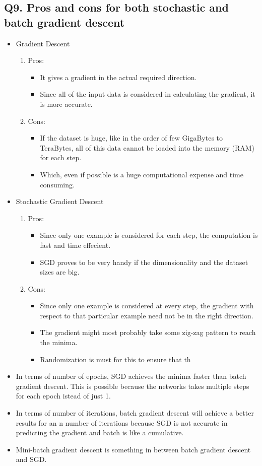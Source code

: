 \documentclass[a4paper,11pt]{article}
\begin{document}
\subsection*{Q9. Pros and cons for both stochastic and batch gradient descent}
\begin{itemize}
	\item Gradient Descent
		\begin{enumerate}
			\item Pros:
			 	\begin{itemize}
			 		\item It gives a gradient in the actual required direction.
			 		\item Since all of the input data is considered in calculating the gradient, it is more accurate.
			 	\end{itemize}
		 	\item Cons:
		 	\begin{itemize}
		 		\item If the dataset is huge, like in the order of few GigaBytes to TeraBytes, all of this data cannot be loaded into the memory (RAM) for each step.
		 		\item Which, even if possible is a huge computational expense and time consuming.
		 	\end{itemize}
		\end{enumerate}
	\item Stochastic Gradient Descent
	\begin{enumerate}
		\item Pros:
		\begin{itemize}
			\item Since only one example is considered for each step, the computation is fast and time effecient.
			\item SGD proves to be very handy if the dimensionality and the dataset sizes are big.
		\end{itemize}
		\item Cons:
		\begin{itemize}
			\item Since only one example is considered at every step, the gradient with respect to that particular example need not be in the right direction.
			\item The gradient might most probably take some zig-zag pattern to reach the minima.
			\item Randomization is must for this to ensure that th
		\end{itemize}
	\end{enumerate}
	\item In terms of number of epochs, SGD achieves the minima faster than batch gradient descent. This is possible because the networks takes multiple steps for each epoch istead of just 1.
	\item In terms of number of iterations, batch gradient descent will achieve a better results for an n number of iterations because SGD is not accurate in predicting the gradient and batch is like a cumulative.
	\item Mini-batch gradient descent is something in between batch gradient descent and SGD.
\end{itemize}
\end{document}
